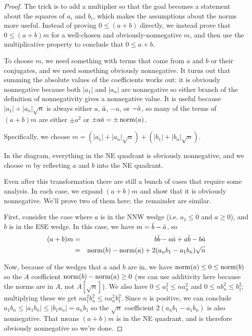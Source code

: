 \begin{proof}
  The trick is to add a multiplier so that the goal becomes a statement about
  the squares of $a_i$ and $b_i$, which makes the assumptions about the norms
  more useful. Instead of proving $0 \leq (a + b)$ directly, we instead prove
  that $0 \leq (a + b)m$ for a well-chosen and obviously-nonnegative $m$, and then
  use the multiplicative property to conclude that $0 \leq a + b$.

  To choose $m$, we need something with terms that come from $a$ and $b$ or
  their conjugates, and we need something obviously nonnegative. It turns out that
  summing the absolute values of the coefficients works out: it is obviously
  nonnegative because both $|a_1|$ and $|a_n|$ are nonnegative so either branch of
  the definition of nonnegativity gives a nonnegative value. It is useful because
  $|a_1| + |a_n|\sqrt{n}$ is always either $a$, $\bar{a}$, $-a$, or
  $-\bar{a}$, so many of the terms of $(a + b)m$ are either $\pm a^2$ or $\pm
  a\bar{a} = \pm \operatorname{norm}(a)$.

  Specifically, we choose $m = (|a_1| + |a_n|\sqrt{n}) + (|b_1| + |b_n|\sqrt{n})$.

  In the diagram, everything in the NE quadrant is obviously nonnegative, and
  we choose $m$ by reflecting $a$ and $b$ into the NE quadrant.

  Even after this transformation there are still a bunch of cases that require
  some analysis. In each case, we expand $(a+b)m$ and show that it is obviously
  nonnegative. We'll prove two of them here; the remainder are similar.

  First, consider the case where $a$ is in the NNW wedge (i.e. $a_1 \leq 0$ and
  $a \geq 0$), and $b$ is in the ESE wedge. In this case, we have $m = \bar{b}
  - \bar{a}$, so
  \begin{eqnarray*}
    (a + b)m
      & = & b\bar{b} - a\bar{a} + a\bar{b} - b\bar{a} \\
      & = & \operatorname{norm}(b) - \operatorname{norm}(a) + 2(a_nb_1 - a_1b_n)\sqrt{n} \\
  \end{eqnarray*}

  Now, because of the wedges that $a$ and $b$ are in, we have $\operatorname{norm}(a) \leq 0
  \leq \operatorname{norm}(b)$ so the $A$ coefficient $\operatorname{norm}(b) - \operatorname{norm}(a) \geq 0$ (we can
  use additivity here because the norms are in $A$, not $A[\sqrt{n}]$).
  We also have $0 \leq a_1^2 \leq na_n^2$ and $0 \leq nb_n^2 \leq b_1^2$;
  multiplying these we get $na_1^2b_n^2 \leq na_n^2b_1^2$. Since $n$ is
  positive, we can conclude $a_1b_n \leq |a_1b_n| \leq |b_1a_n| = a_nb_1$ so the
  $\sqrt{n}$ coefficient $2(a_nb_1 - a_1b_n)$ is also nonnegative. That means
  $(a+b)m$ is in the NE quadrant, and is therefore obviously nonnegative so
  we're done.


\end{proof}
